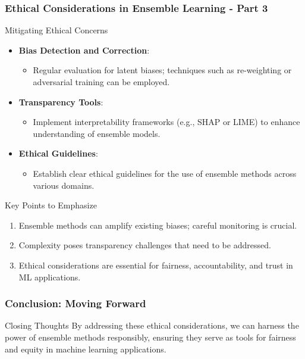 \documentclass[aspectratio=169]{beamer}
\begin{document}
\begin{frame}[fragile]
    \frametitle{Ethical Considerations in Ensemble Learning - Part 3}
    \begin{block}{Mitigating Ethical Concerns}
        \begin{itemize}
            \item \textbf{Bias Detection and Correction}:
                \begin{itemize}
                    \item Regular evaluation for latent biases; techniques such as re-weighting or adversarial training can be employed.
                \end{itemize}
            \item \textbf{Transparency Tools}:
                \begin{itemize}
                    \item Implement interpretability frameworks (e.g., SHAP or LIME) to enhance understanding of ensemble models.
                \end{itemize}
            \item \textbf{Ethical Guidelines}:
                \begin{itemize}
                    \item Establish clear ethical guidelines for the use of ensemble methods across various domains.
                \end{itemize}
        \end{itemize}
        
        \begin{block}{Key Points to Emphasize}
            \begin{enumerate}
                \item Ensemble methods can amplify existing biases; careful monitoring is crucial.
                \item Complexity poses transparency challenges that need to be addressed.
                \item Ethical considerations are essential for fairness, accountability, and trust in ML applications.
            \end{enumerate}
        \end{block}
    \end{block}
\end{frame}

\begin{frame}[fragile]
    \frametitle{Conclusion: Moving Forward}
    \begin{block}{Closing Thoughts}
        By addressing these ethical considerations, we can harness the power of ensemble methods responsibly, ensuring they serve as tools for fairness and equity in machine learning applications.
    \end{block}
\end{frame}
\end{document}
